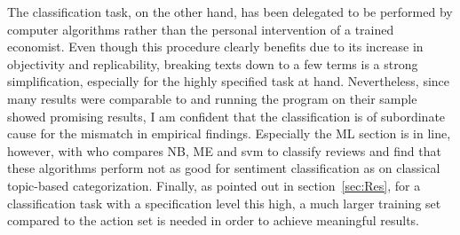 The classification task, on the other hand, has been delegated to be performed by computer algorithms rather than the personal intervention of a trained economist. Even though this procedure clearly benefits due to its increase in objectivity and replicability, breaking texts down to a few terms is a strong simplification, especially for the highly specified task at hand. Nevertheless, since many results were comparable to \textcite{Ellingsen.2003} and running the program on their sample showed promising results, I am confident that the classification is of subordinate cause for the mismatch in empirical findings. Especially the ML section is in line, however,  with \textcite{Pang.2002} who compares NB, ME and svm to classify reviews and find that these algorithms perform not as good for sentiment classification as on classical topic-based categorization. Finally, as pointed out in section~\ref{sec:Res}, for a classification task with a specification level this high, a much larger training set compared to the action set is needed in order to achieve meaningful results. 